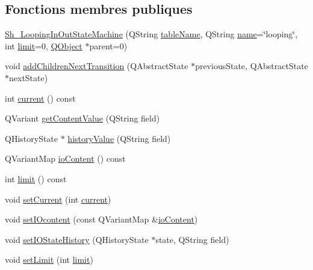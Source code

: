 \subsection*{Fonctions membres publiques}
\begin{DoxyCompactItemize}
\item 
\hyperlink{classSh__LoopingInOutStateMachine_a5de32ba5bb4fd034036a16665f91cdb4}{Sh\-\_\-\-Looping\-In\-Out\-State\-Machine} (Q\-String \hyperlink{classSH__InOutStateMachine_a4288a6c86ddf83effefff886675591c9}{table\-Name}, Q\-String \hyperlink{classSH__NamedObject_a9f686c6f2a5bcc08ad03d0cee0151f0f}{name}=\char`\"{}looping\char`\"{}, int \hyperlink{classSh__LoopingInOutStateMachine_aa015094a00155fc04a1859da5545acc9}{limit}=0, \hyperlink{classQObject}{Q\-Object} $\ast$parent=0)
\item 
void \hyperlink{classSh__LoopingInOutStateMachine_a20d5e4d9feea63bea747b45b7c10ca01}{add\-Children\-Next\-Transition} (Q\-Abstract\-State $\ast$previous\-State, Q\-Abstract\-State $\ast$next\-State)
\item 
int \hyperlink{classSh__LoopingInOutStateMachine_a6c642c84af6988031c4e2a85196eb2e6}{current} () const 
\item 
Q\-Variant \hyperlink{classSH__InOutStateMachine_aa1a3bd3c0ea8a59b9bc916dc718eb9ca}{get\-Content\-Value} (Q\-String field)
\item 
Q\-History\-State $\ast$ \hyperlink{classSH__InOutStateMachine_af71bfdb3b59b7bf2763588b513b4205f}{history\-Value} (Q\-String field)
\item 
Q\-Variant\-Map \hyperlink{classSH__InOutStateMachine_aaca105fbd5f5cc3bac115389ad3694c5}{io\-Content} () const 
\item 
int \hyperlink{classSh__LoopingInOutStateMachine_ac44b7158256f09b878c8958cf3ae3bf8}{limit} () const 
\item 
void \hyperlink{classSh__LoopingInOutStateMachine_a48881465e2f21524dc8911ff94a60dca}{set\-Current} (int \hyperlink{classSh__LoopingInOutStateMachine_a6c642c84af6988031c4e2a85196eb2e6}{current})
\item 
void \hyperlink{classSH__InOutStateMachine_a8271a7ec7d5f6502449dd3b4da5f4155}{set\-I\-Ocontent} (const Q\-Variant\-Map \&\hyperlink{classSH__InOutStateMachine_aaca105fbd5f5cc3bac115389ad3694c5}{io\-Content})
\item 
void \hyperlink{classSH__InOutStateMachine_acbcce2c4300af1634d928b30e5e9be1c}{set\-I\-O\-State\-History} (Q\-History\-State $\ast$state, Q\-String field)
\item 
void \hyperlink{classSh__LoopingInOutStateMachine_a34e317bd7e5aa9fed88fb6df90c85f16}{set\-Limit} (int \hyperlink{classSh__LoopingInOutStateMachine_aa015094a00155fc04a1859da5545acc9}{limit})

\end{DoxyCompactItemize}
